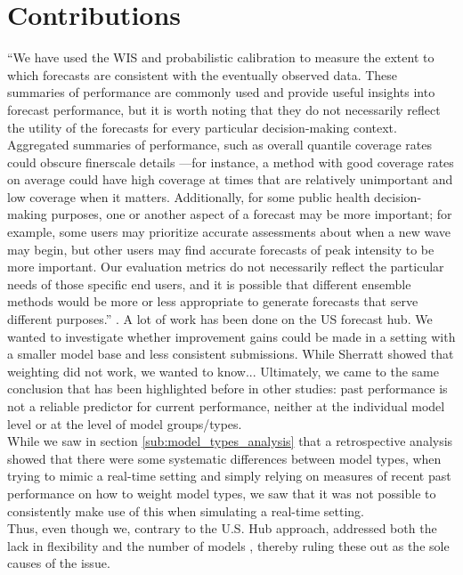 \section{Contributions}
``We have used the WIS and probabilistic calibration to measure the extent to which forecasts
are consistent with the eventually observed data. These summaries of performance are commonly
used and provide useful insights into forecast performance, but it is worth noting that they do
not necessarily reflect the utility of the forecasts for every particular decision-making context.
Aggregated summaries of performance, such as overall quantile coverage rates could obscure finerscale
details —for instance, a method with good coverage rates on average could have high coverage
at times that are relatively unimportant and low coverage when it matters. Additionally, for some
public health decision-making purposes, one or another aspect of a forecast may be more important;
for example, some users may prioritize accurate assessments about when a new wave may begin,
but other users may find accurate forecasts of peak intensity to be more important. Our evaluation
metrics do not necessarily reflect the particular needs of those specific end users, and it is possible
that different ensemble methods would be more or less appropriate to generate forecasts that serve
different purposes.'' \citep{ray_comparing_2022}.
A lot of work has been done on the US forecast hub. We wanted to investigate whether improvement gains could be made in a setting with a smaller model base and less consistent submissions. While Sherratt showed that weighting did not work, we wanted to know... Ultimately, we came to the same conclusion that has been highlighted before in other studies: past performance is not a reliable predictor for current performance, neither at the individual model level or at the level of model groups/types. \\
While we saw in section \ref{sub:model_types_analysis} that a retrospective analysis showed that there were some systematic differences between model types, when trying to mimic a real-time setting and simply relying on measures of recent past performance on how to weight model types, we saw that it was not possible to consistently make use of this when simulating a real-time setting.  \\
Thus, even though we, contrary to the U.S. Hub approach, addressed both the lack in flexibility and the number of models , thereby ruling these out as the sole causes of the issue.\\\\
